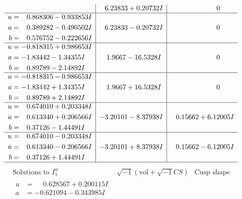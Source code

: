 \documentclass[1p]{elsarticle_modified}
\theoremstyle{definition}
\newcommand{\I}{\sqrt{-1}}
\begin{document}
$$\begin{array}{c|c|c}
 & \phantom{-}6.23833 + 0.20732 I & \phantom{-0.000000 } 0 \\ \hline\begin{aligned}
u &= \phantom{-}0.868306 - 0.933853 I \\
a &= \phantom{-}0.389282 - 0.490502 I \\
b &= \phantom{-}0.576752 - 0.222656 I\end{aligned}
 & \phantom{-}6.23833 - 0.20732 I & \phantom{-0.000000 } 0 \\ \hline\begin{aligned}
u &= -0.818315 + 0.986653 I \\
a &= -1.83442 - 1.34355 I \\
b &= \phantom{-}0.89789 - 2.14892 I\end{aligned}
 & \phantom{-}1.9667 - 16.5328 I & \phantom{-0.000000 } 0 \\ \hline\begin{aligned}
u &= -0.818315 - 0.986653 I \\
a &= -1.83442 + 1.34355 I \\
b &= \phantom{-}0.89789 + 2.14892 I\end{aligned}
 & \phantom{-}1.9667 + 16.5328 I & \phantom{-0.000000 } 0 \\ \hline\begin{aligned}
u &= \phantom{-}0.674010 + 0.203348 I \\
a &= \phantom{-}0.613340 + 0.206566 I \\
b &= \phantom{-}0.37126 - 1.44491 I\end{aligned}
 & -3.20101 - 8.37938 I & \phantom{-}0.15662 + 6.12005 I \\ \hline\begin{aligned}
u &= \phantom{-}0.674010 - 0.203348 I \\
a &= \phantom{-}0.613340 - 0.206566 I \\
b &= \phantom{-}0.37126 + 1.44491 I\end{aligned}
 & -3.20101 + 8.37938 I & \phantom{-}0.15662 - 6.12005 I\\
 \hline 
 \end{array}$$\newpage$$\begin{array}{c|c|c}  
\text{Solutions to }I^u_{1}& \I (\text{vol} + \sqrt{-1}CS) & \text{Cusp shape}\\
 \hline 
\begin{aligned}
u &= \phantom{-}0.628567 + 0.200115 I \\
a &= -0.621094 - 0.343985 I \\

\end{aligned}
\end{array}$$
\end{document}
